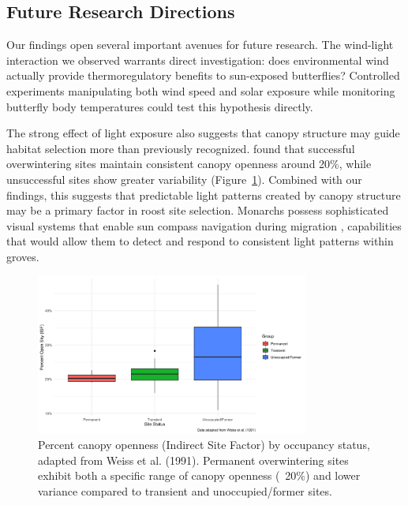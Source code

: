 \subsection{Future Research Directions}

Our findings open several important avenues for future research. The wind-light interaction we observed warrants direct investigation: does environmental wind actually provide thermoregulatory benefits to sun-exposed butterflies? Controlled experiments manipulating both wind speed and solar exposure while monitoring butterfly body temperatures could test this hypothesis directly.

The strong effect of light exposure also suggests that canopy structure may guide habitat selection more than previously recognized. \textcite{weissForestCanopyStructure1991} found that successful overwintering sites maintain consistent canopy openness around 20\%, while unsuccessful sites show greater variability (Figure~\ref{fig:weiss_canopy}). Combined with our findings, this suggests that predictable light patterns created by canopy structure may be a primary factor in roost site selection. Monarchs possess sophisticated visual systems that enable sun compass navigation during migration \parencite{nguyenSunCompassNeurons2021,mouritsenVirtualMigrationTethered2002}, capabilities that would allow them to detect and respond to consistent light patterns within groves.

\begin{figure}[h]
    \centering
    \includegraphics[width=0.8\textwidth]{figures/discussion/weiss_adapted_boxplot.png}
    \caption{Percent canopy openness (Indirect Site Factor) by occupancy status, adapted from Weiss et al. (1991). Permanent overwintering sites exhibit both a specific range of canopy openness (~20\%) and lower variance compared to transient and unoccupied/former sites.}
    \label{fig:weiss_canopy}
\end{figure}

